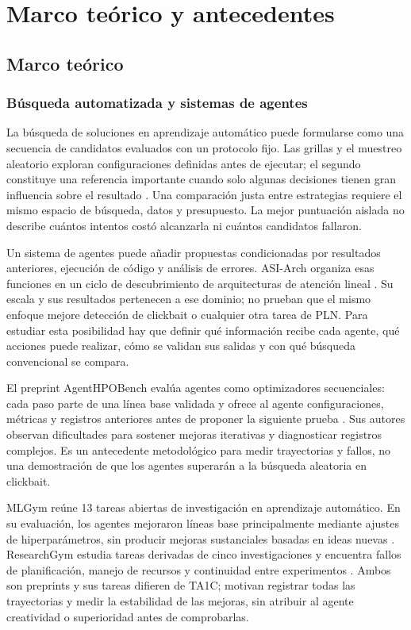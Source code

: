 \chapter{Marco teórico y antecedentes}
\label{cap:marco}

\section{Marco teórico}

\subsection{Búsqueda automatizada y sistemas de agentes}

La búsqueda de soluciones en aprendizaje automático puede formularse como una secuencia de candidatos evaluados con un protocolo fijo. Las grillas y el muestreo aleatorio exploran configuraciones definidas antes de ejecutar; el segundo constituye una referencia importante cuando solo algunas decisiones tienen gran influencia sobre el resultado \citep{bergstra2012}. Una comparación justa entre estrategias requiere el mismo espacio de búsqueda, datos y presupuesto. La mejor puntuación aislada no describe cuántos intentos costó alcanzarla ni cuántos candidatos fallaron.

Un sistema de agentes puede añadir propuestas condicionadas por resultados anteriores, ejecución de código y análisis de errores. ASI-Arch organiza esas funciones en un ciclo de descubrimiento de arquitecturas de atención lineal \citep{liu2025asiarch}. Su escala y sus resultados pertenecen a ese dominio; no prueban que el mismo enfoque mejore detección de clickbait o cualquier otra tarea de PLN. Para estudiar esta posibilidad hay que definir qué información recibe cada agente, qué acciones puede realizar, cómo se validan sus salidas y con qué búsqueda convencional se compara.

El preprint AgentHPOBench evalúa agentes como optimizadores secuenciales: cada paso parte de una línea base validada y ofrece al agente configuraciones, métricas y registros anteriores antes de proponer la siguiente prueba \citep{huai2026agenthpobench}. Sus autores observan dificultades para sostener mejoras iterativas y diagnosticar registros complejos. Es un antecedente metodológico para medir trayectorias y fallos, no una demostración de que los agentes superarán a la búsqueda aleatoria en clickbait.

MLGym reúne 13 tareas abiertas de investigación en aprendizaje automático. En su evaluación, los agentes mejoraron líneas base principalmente mediante ajustes de hiperparámetros, sin producir mejoras sustanciales basadas en ideas nuevas \citep{nathani2025mlgym}. ResearchGym estudia tareas derivadas de cinco investigaciones y encuentra fallos de planificación, manejo de recursos y continuidad entre experimentos \citep{garikaparthi2026researchgym}. Ambos son preprints y sus tareas difieren de TA1C; motivan registrar todas las trayectorias y medir la estabilidad de las mejoras, sin atribuir al agente creatividad o superioridad antes de comprobarlas.

